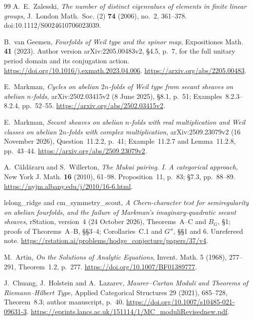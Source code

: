 \documentclass[11pt]{article}
\theoremstyle{definition}
\theoremstyle{remark}
\begin{document}
\begin{thebibliography}{99}
A.~E.~Zalesski,
\emph{The number of distinct eigenvalues of elements in finite
linear groups},
J.~London Math.~Soc. (2) \textbf{74} (2006), no.~2, 361--378.
doi:10.1112/S0024610706023039.

B.~van Geemen, \emph{Fourfolds of Weil type and the spinor map},
Expositiones Math. \textbf{41} (2023).
Author version arXiv:2205.00483v2, \S4.5, p.~7, for the full
unitary period domain and its conjugation action.
\url{https://doi.org/10.1016/j.exmath.2023.04.006}.
\url{https://arxiv.org/abs/2205.00483}.

 E.~Markman,
\emph{Cycles on abelian $2n$-folds of Weil type from secant sheaves
on abelian $n$-folds}, arXiv:2502.03415v2 (8 June 2025),
\S8.1, p.~51; Examples~8.2.3--8.2.4, pp.~52--55.
\url{https://arxiv.org/abs/2502.03415v2}.

 E.~Markman,
\emph{Secant sheaves on abelian $n$-folds with real multiplication
and Weil classes on abelian $2n$-folds with complex multiplication},
arXiv:2509.23079v2 (16 November 2026),
Question~11.2.2, p.~41; Example~11.2.7 and Lemma~11.2.8, pp.~43--44.
\url{https://arxiv.org/abs/2509.23079v2}.

 A.~C\u{a}ld\u{a}raru and S.~Willerton,
\emph{The Mukai pairing. I. A categorical approach},
New York J. Math. \textbf{16} (2010), 61--98.
Proposition~11, p.~83; \S7.3, pp.~88--89.
\url{https://nyjm.albany.edu/j/2010/16-6.html}.

 lelong\_ridge and cm\_symmetry\_scout,
\emph{A Chern-character test for semiregularity on abelian fourfolds,
and the failure of Markman's imaginary-quadratic secant sheaves},
rStation, version~4 (24 October 2026), Theorems~A--C and $B_G$,
\S1; proofs of Theorems~A--B, \S\S3--4;
Corollaries~C.1 and $G''$, \S\S1 and 6. Unrefereed note.
\url{https://rstation.ai/problems/hodge_conjecture/papers/37/v4}.

M.~Artin, \emph{On the Solutions of Analytic Equations},
Invent. Math. 5 (1968), 277--291, Theorem~1.2, p.~277.
\url{https://doi.org/10.1007/BF01389777}.

J.~Chuang, J.~Holstein and A.~Lazarev,
\emph{Maurer--Cartan Moduli and Theorems of Riemann--Hilbert Type},
Applied Categorical Structures 29 (2021), 685--728,
Theorem~8.3; author manuscript, p.~40.
\url{https://doi.org/10.1007/s10485-021-09631-3}.
\url{https://eprints.lancs.ac.uk/151114/1/MC_moduliRevisednew.pdf}.


\end{thebibliography}
\end{document}
